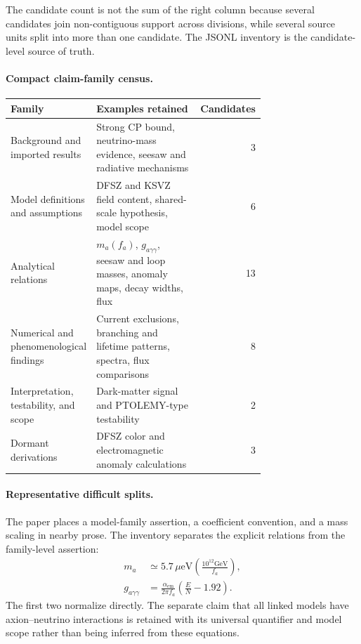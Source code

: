 The candidate count is not the sum of the right column because several
candidates join non-contiguous support across divisions, while several source
units split into more than one candidate. The JSONL inventory is the
candidate-level source of truth.

\paragraph{Compact claim-family census.}
\begin{center}
\begin{tabular}{p{0.24\linewidth}p{0.48\linewidth}r}
\hline
Family & Examples retained & Candidates \\
\hline
Background and imported results & Strong CP bound, neutrino-mass evidence,
seesaw and radiative mechanisms & 3 \\
Model definitions and assumptions & DFSZ and KSVZ field content, shared-scale
hypothesis, model scope & 6 \\
Analytical relations & $m_a(f_a)$, $g_{a\gamma\gamma}$, seesaw and loop masses,
anomaly maps, decay widths, flux & 13 \\
Numerical and phenomenological findings & Current exclusions, branching and
lifetime patterns, spectra, flux comparisons & 8 \\
Interpretation, testability, and scope & Dark-matter signal and PTOLEMY-type
testability & 2 \\
Dormant derivations & DFSZ color and electromagnetic anomaly calculations & 3 \\
\hline
\end{tabular}
\end{center}

\paragraph{Representative difficult splits.}
The paper places a model-family assertion, a coefficient convention, and a
mass scaling in nearby prose. The inventory separates the explicit relations
from the family-level assertion:
\[
\begin{aligned}
 m_a &\simeq 5.7\,\mu\mathrm{eV}
 \left(\frac{10^{12} \mathrm{GeV}}{f_a}\right),\\
 g_{a\gamma\gamma} &= \frac{\alpha_{\mathrm{em}}}{2\pi f_a}
 \left(\frac{E}{N}-1.92\right).
\end{aligned}
\]
The first two normalize directly. The separate claim that all linked models
have axion--neutrino interactions is retained with its universal quantifier and
model scope rather than being inferred from these equations.

